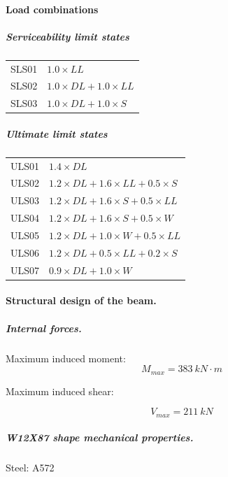 \paragraph{Load combinations}

\subparagraph{Serviceability limit states}
\begin{center}
  \begin{tabular}{|l|l|}
    \hline
    SLS01 & $1.0 \times LL$ \\
    SLS02 & $1.0 \times DL+1.0 \times LL$ \\
    SLS03 & $1.0 \times DL+1.0 \times S$ \\
    \hline
  \end{tabular}
  \end{center}

\subparagraph{Ultimate limit states}
\begin{center}
  \begin{tabular}{|l|l|}
    \hline
ULS01 & $1.4 \times DL$ \\
ULS02 & $1.2 \times DL + 1.6 \times LL + 0.5 \times S$ \\
ULS03 & $1.2 \times DL + 1.6 \times S + 0.5 \times LL $ \\
ULS04 & $1.2 \times DL + 1.6 \times S + 0.5 \times W$ \\
ULS05 & $1.2 \times DL + 1.0 \times W + 0.5 \times LL $ \\
ULS06 & $1.2 \times DL + 0.5 \times LL + 0.2 \times S$ \\
ULS07 & $0.9 \times DL + 1.0 \times W$ \\
    \hline
  \end{tabular}
  \end{center}

\paragraph{Structural design of the beam.}

\subparagraph{Internal forces.}

\noindent Maximum induced moment:
\begin{equation}
  M_{max}= 383\ kN \cdot m
\end{equation}

\noindent Maximum induced shear:

\begin{equation}
  V_{max}= 211\ kN
\end{equation}

\subparagraph{W12X87 shape mechanical properties.} Steel: A572

